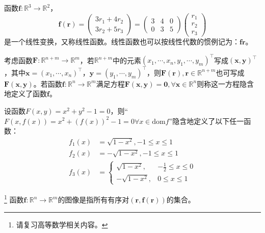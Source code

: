 \documentclass[main.tex]{subfiles}
\begin{document}
\begin{example}
函数$\mathbf{f}:\mathbb{R}^3\rightarrow\mathbb{R}^2$，
\[\mathbf{f}\left(\mathbf{r}\right)=\left(\begin{array}{c}3r_1+4r_2\\3r_2+5r_3\end{array}\right)=\left(\begin{array}{ccc}3&4&0\\0&3&5\end{array}\right)\left(\begin{array}{c}r_1\\r_2\\r_3\end{array}\right)\]
是一个线性变换，又称线性函数。线性函数也可以按线性代数的惯例记为：$\mathbf{fr}$。
\end{example}

\begin{definition}[隐函数]
考虑函数$\mathbf{F}:\mathbb{R}^{n+m}\rightarrow\mathbb{R}^m$，若$\mathbb{R}^{n+m}$中的元素$\left(x_1,\cdots,x_n,y_1,\cdots,y_m\right)^\intercal$写成$\left(\mathbf{x},\mathbf{y}\right)^\intercal$，其中$\mathbf{x}=\left(x_1,\cdots,x_n\right)^\intercal$，$\mathbf{y}=\left(y_1,\cdots,y_m\right)^\intercal$，则$\mathbf{F}\left(\mathbf{r}\right),\mathbf{r}\in\mathbb{R}^{n+m}$也可写成$\mathbf{F}\left(\mathbf{x},\mathbf{y}\right)$。若函数$\mathbf{f}:\mathbb{R}^n\rightarrow\mathbb{R}^m$满足方程$\mathbf{F}\left(\mathbf{x},\mathbf{y}\right)=\mathbf{0},\forall\mathbf{x}\in\mathbb{R}^n$则称这一方程隐含地定义了函数$\mathbf{f}$。
\end{definition}

\begin{example}
设函数$F\left(x,y\right)=x^2+y^2-1=0$，则“$F\left(x,f\left(x\right)\right)=x^2+\left(f\left(x\right)\right)^2-1=0\forall x\in\mathrm{dom}f$”隐含地定义了以下任一函数：
\begin{align*}
    f_1\left(x\right)&=\sqrt{1-x^2},-1\leq x\leq 1\\
    f_2\left(x\right)&=-\sqrt{1-x^2},-1\leq x\leq 1\\
    f_3\left(x\right)&=\left\{\begin{array}{ll}
    \sqrt{1-x^2},&-\frac{1}{2}\leq x\leq 0\\
    -\sqrt{1-x^2},&0\leq x\leq 1
    \end{array}\right.
\end{align*}
\end{example}

\begin{definition}[函数的图像]\footnote{请复习高等数学相关内容\cite[\S 6.4~6.7]{华工高数2009上}。}
函数$\mathbf{f}:\mathbb{R}^n\rightarrow\mathbb{R}^m$的图像是指所有有序对$\left(\mathbf{r},\mathbf{f}\left(\mathbf{r}\right)\right)$的集合。
\end{definition}
\end{document}
